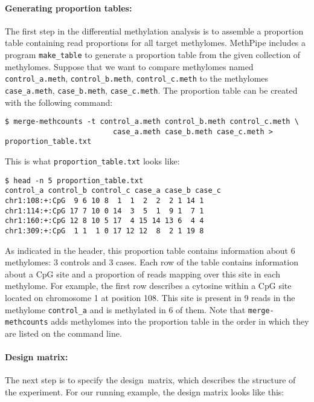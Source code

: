 \documentclass[10pt]{article}
\newcommand{\prog}[1]{\texttt{#1}}
\begin{document}
\paragraph{Generating proportion tables:} The first step in the differential 
methylation analysis is to assemble a proportion table containing read 
proportions for all target methylomes. MethPipe includes a program 
\prog{make\_table} to generate a proportion table from the given collection of 
methylomes. Suppose that we want to compare methylomes named 
{\tt control\_a.meth}, {\tt control\_b.meth}, {\tt control\_c.meth}
to the methylomes {\tt case\_a.meth}, {\tt case\_b.meth}, 
{\tt case\_c.meth}. The proportion table can be created with the following 
command:

{\small{%
\begin{verbatim}
$ merge-methcounts -t control_a.meth control_b.meth control_c.meth \
                         case_a.meth case_b.meth case_c.meth > proportion_table.txt
\end{verbatim}%
}}

This is what {\tt proportion\_table.txt} looks like:

{\small{%
\begin{verbatim}
$ head -n 5 proportion_table.txt
control_a control_b control_c case_a case_b case_c
chr1:108:+:CpG  9 6 10 8  1  1  2  2  2 1 14 1
chr1:114:+:CpG 17 7 10 0 14  3  5  1  9 1  7 1
chr1:160:+:CpG 12 8 10 5 17  4 15 14 13 6  4 4
chr1:309:+:CpG  1 1  1 0 17 12 12  8  2 1 19 8
\end{verbatim}%
}}

As indicated in the header, this proportion table contains information about 6
methylomes: 3 controls and 3 cases. Each row of the table contains information
about a CpG site and a proportion of reads mapping over this site in each
methylome. For example, the first row describes a cytosine within a CpG site
located on chromosome 1 at position 108. This site is present in 9 reads in the
methylome {\tt control\_a} and is methylated in 6 of them. Note that 
\prog{merge-methcounts} adds methylomes into the proportion table in the order 
in which they are listed on the command line.

\paragraph{Design matrix:} The next step is to specify the design\ matrix, which
describes the structure of the experiment. For our running example, the design
matrix looks like this:
\end{document}
